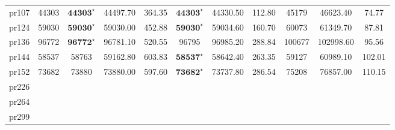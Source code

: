 \documentclass[12pt]{ctexart}
\begin{document}
\begin{table}[htbp]
\begin{tabular}{rcccccccccc}
        pr107                         & 44303                             & $\textbf{44303}^\star$      & 44497.70                               & 364.35           & $\textbf{44303}^\star$  & 44330.50         & 112.80           & 45179                 & 46623.40         & 74.77            \\
        pr124                         & 59030                             & $\textbf{59030}^\star$      & 59030.00                               & 452.88           & $\textbf{59030}^\star$  & 59034.60         & 160.70           & 60073                 & 61349.70         & 87.81            \\
        pr136                         & 96772                             & $\textbf{96772}^\star$      & 96781.10                               & 520.55           & 96795                   & 96985.20         & 288.84           & 100677                & 102998.60        & 95.56            \\
        pr144                         & 58537                             & 58763                       & 59162.80                               & 603.83           & $\textbf{58537}^\star$  & 58642.40         & 263.35           & 59127                 & 60989.10         & 102.01           \\
        pr152                         & 73682                             & 73880                       & 73880.00                               & 597.60           & $\textbf{73682}^\star$  & 73737.80         & 286.54           & 75208                 & 76857.00         & 110.15           \\
        pr226                                                                                                                                                                                                                                                                                     \\
        pr264                                                                                                                                                                                                                                                                                     \\
        pr299                                                                                                                                                                                                                                                                                     \\

\end{tabular}
\end{table}
\end{document}
